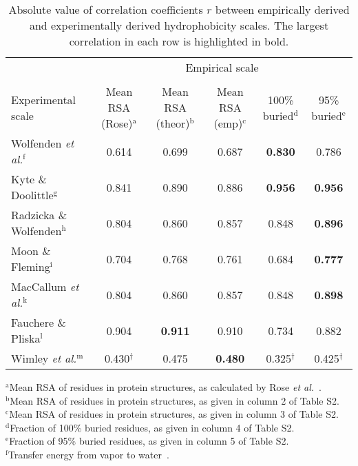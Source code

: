 \documentclass[11pt]{article}
\begin{document}
\begin{table}[H]
\caption{\label{tab:Corr}Absolute value of correlation coefficients $r$ between empirically derived and experimentally derived hydrophobicity scales. The largest correlation in each row is highlighted in bold.}
\begin{center}
\footnotesize
\begin{tabular}{lccccc}
 & \multicolumn{5}{c}{Empirical scale} \\ \cline{2-6}\\[-2ex]
Experimental scale & Mean RSA (Rose)$^\text{a}$ & Mean RSA (theor)$^\text{b}$ & Mean RSA (emp)$^\text{c}$ & 100\% buried$^\text{d}$ & 95\% buried$^\text{e}$\\
\hline
Wolfenden \emph{et al.}$^\text{f}$ & 0.614 & 0.699 & 0.687 & \textbf{0.830} & 0.786 \\
Kyte \& Doolittle$^\text{g}$ & 0.841 & 0.890 & 0.886 & \textbf{0.956} & \textbf{0.956} \\
Radzicka \& Wolfenden$^\text{h}$ & 0.804 & 0.860 & 0.857 & 0.848 & \textbf{0.896} \\
Moon \& Fleming$^\text{i}$ & 0.704 & 0.768 & 0.761 & 0.684 & \bf{0.777} \\
MacCallum \emph{et al.}$^\text{k}$ & 0.804 & 0.860 & 0.857 & 0.848 & \textbf{0.898} \\
Fauchere \& Pliska$^\text{l}$ & 0.904 & \textbf{0.911} & 0.910 & 0.734 & 0.882 \\
Wimley \emph{et al.}$^\text{m}$ & 0.430$^\dagger$ & 0.475 & \textbf{0.480} & 0.325$^\dagger$ & 0.425$^\dagger$ \\
\hline
\end{tabular}
\end{center}
{\footnotesize
\begin{raggedright}
$^\text{a}$Mean RSA of residues in protein structures, as calculated by Rose \emph{et al.}~\cite{Rose1985}.\\
$^\text{b}$Mean RSA of residues in protein structures, as given in column 2 of Table S2.\\ 
$^\text{c}$Mean RSA of residues in protein structures, as given in column 3 of Table S2.\\
$^\text{d}$Fraction of 100\% buried residues, as given in column 4 of Table S2.\\
$^\text{e}$Fraction of 95\% buried residues, as given in column 5 of Table S2.\\
$^\text{f}$Transfer energy from vapor to water~\cite{Wolfenden1981}.\\

\end{raggedright}}
\end{table}
\end{document}
